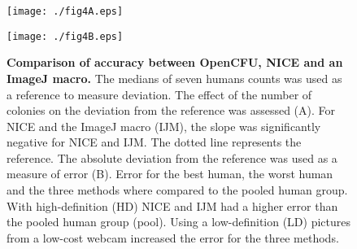 \documentclass[10pt]{article}
\newcommand{\n}{seven}
\newcommand{\IJM}{IJM}
\begin{document}
\newpage{}




\begin{figure}[!ht]
\begin{center}
\texttt{[image: ./fig4A.eps]}

\texttt{[image: ./fig4B.eps]}

\end{center}

\caption{{\bf Comparison of accuracy between OpenCFU, NICE\cite{clarke_lowcost_2010} and  an ImageJ macro\cite{cai_optimized_2011}.} 
The medians of \n{} humans counts was used as a reference to measure deviation. The effect of
the number of colonies on the deviation from the reference was assessed (A). For NICE and the ImageJ macro (\IJM), the
slope was significantly negative for NICE and \IJM{}. The dotted line represents the reference.
The absolute deviation from the reference was used as a measure of error (B). Error
for the best human, the worst human and the three methods where compared to the
pooled human group. With high-definition (HD) NICE and \IJM{} had a higher error than the pooled human
group (pool). Using a low-definition (LD) pictures from a low-cost webcam increased the error for the three methods.}
\label{figAccu}
\end{figure}


\newpage{}
\end{document}
